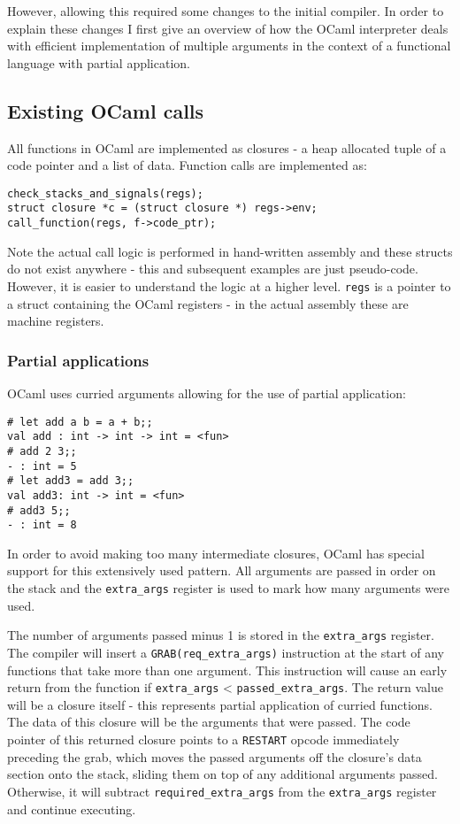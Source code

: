 However, allowing this required some changes to the initial compiler. In order to explain these
changes I first give an overview of how the OCaml interpreter deals with efficient
implementation of multiple arguments in the context of a functional language with partial
application.

\subsection{Existing OCaml calls} \label{exist-ocaml}

All functions in OCaml are implemented as closures - a heap allocated tuple of a code pointer and a
list of data. Function calls are implemented as:

\begin{verbatim}
check_stacks_and_signals(regs);
struct closure *c = (struct closure *) regs->env;
call_function(regs, f->code_ptr);
\end{verbatim}

Note the actual call logic is performed in hand-written assembly and these structs do not exist
anywhere
- this and subsequent examples are just pseudo-code. However, it is easier to understand the logic
at a higher level. \texttt{regs} is a pointer to a struct containing the OCaml registers - in the
actual assembly these are machine registers.

\subsubsection{Partial applications}

OCaml uses curried arguments allowing for the use of partial application:

\begin{verbatim}
# let add a b = a + b;;
val add : int -> int -> int = <fun>
# add 2 3;;
- : int = 5
# let add3 = add 3;;
val add3: int -> int = <fun>
# add3 5;;
- : int = 8
\end{verbatim}

In order to avoid making too many intermediate closures, OCaml has special support for this
extensively used pattern. All arguments are passed in order on the stack and the
\texttt{extra\_args}
register is used to mark how many arguments were used.

The number of arguments passed minus 1 is stored in the \texttt{extra\_args} register. The compiler
will insert a \texttt{GRAB(req\_extra\_args)} instruction at the start of any functions that take
more than one argument.  This instruction will cause an early return from the function if
\texttt{extra\_args} <
\texttt{passed\_extra\_args}. The return value will be a closure itself - this represents partial
application of curried functions. The data of this closure will be the arguments that were passed.
The code pointer of this returned closure points to a \texttt{RESTART} opcode immediately
preceding the grab, which moves the passed arguments off  the closure's data section onto the
stack, sliding them on top of any additional arguments passed.	Otherwise, it will subtract
\texttt{required\_extra\_args} from the \texttt{extra\_args} register
and continue executing.

